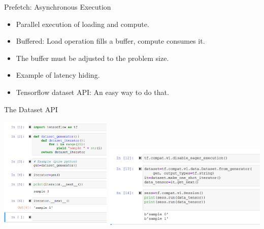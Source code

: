\documentclass[t, 10pt, aspectratio=1610]{beamer}
\begin{document}
\begin{frame}{Prefetch: Asynchronous Execution}
\timebufferone
\vspace{1.0 cm}

\begin{itemize}
    \item Parallel execution of loading and  compute.
    \item Buffered: Load operation fills a buffer, compute consumes it.
    \item The buffer must be adjusted to the problem size.
    \item Example of latency hiding.
    \item Tensorflow dataset API: An easy way to do that.
\end{itemize}
    
\end{frame}




\begin{frame}{The Dataset API}

    \includegraphics[width=0.4\textwidth]{dataset_pure_python.PNG}
    \includegraphics[width=0.59\textwidth]{dataset_tf1.PNG}
\end{frame}
\end{document}
